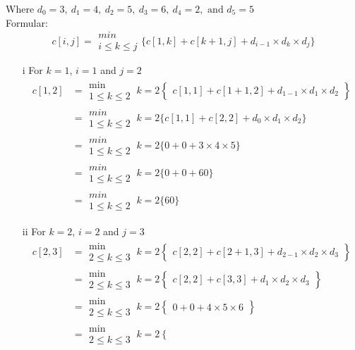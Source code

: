 \documentclass[12pt]{report}
\begin{document}
Where $d_0 = 3, ~d_1=4, ~d_2 = 5, ~d_3=6, ~d_4 = 2, \text{ and } d_5=5$\\
Formular:
$$c[i,j] = \substack{min\\{i\le k \le j}}\bigg\{ c[1,k] + c[k+1,j] + d_{i-1} \times d_k\times d_j\bigg\}$$
\begin{enumerate}
	\item[i] For $k=1$, $i = 1$ and $j=2$
	\begin{align*}
		c[1,2]&=\substack{\text{min}\\1\le k\le 2}~k=2
		\left\{
		\begin{aligned}
			c[1,1] + c[1+1,2] + d_{1-1} \times d_1\times d_2
		\end{aligned}\right\}\\
		& = \substack{min\\{1\le k \le 2}}~k=2\bigg\{ c[1,1] + c[2,2] + d_{0} \times d_1\times d_2\bigg\}\\
		& = \substack{min\\{1\le k \le 2}}~k=2\bigg\{ 0+ 0 + 3 \times 4\times 5\bigg\}\\
		& = \substack{min\\{1\le k \le 2}}~k=2\bigg\{ 0+ 0 + 60\bigg\}\\
		& = \substack{min\\{1\le k \le 2}}~k=2\bigg\{60\bigg\}
	\end{align*} 
	\item[ii] For $k=2$, $i = 2$ and $j=3$
	\begin{align*}
		c[2,3] &=\substack{\text{min}\\2\le k\le 3}~k=2
		\left\{
		\begin{aligned}
			c[2,2] + c[2+1,3] + d_{2-1} \times d_2\times d_3
		\end{aligned}\right\}\\
		&=\substack{\text{min}\\2\le k\le 3}~k=2
		\left\{
		\begin{aligned}
			c[2,2] + c[3,3] + d_{1} \times d_2\times d_3
		\end{aligned}\right\}\\
		&=\substack{\text{min}\\2\le k\le 3}~k=2
		\left\{
		\begin{aligned}
			0 + 0 + 4 \times 5\times 6
		\end{aligned}\right\}\\
		&=\substack{\text{min}\\2\le k\le 3}~k=2
		\left\{
		\begin{aligned}

\end{aligned}
\end{align*}
\end{enumerate}
\end{document}
